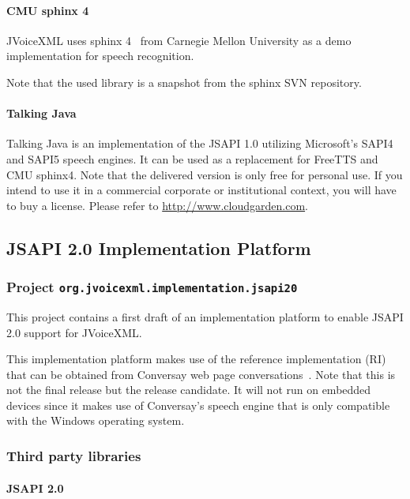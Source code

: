\documentclass[11pt,a4paper]{article}
\begin{document}
\paragraph{CMU sphinx 4}
\label{sec:sphinx}

JVoiceXML uses sphinx 4~\cite{sphinx} from Carnegie Mellon University
as a demo implementation for speech recognition.

Note that the used library is a snapshot from the sphinx SVN repository.

\paragraph{Talking Java}

Talking Java is an implementation of the JSAPI 1.0 utilizing Microsoft's
SAPI4 and SAPI5 speech engines. It can be used as a replacement for FreeTTS
and CMU sphinx4. Note that the delivered version is only free for personal use.
If you intend to use it in a commercial corporate or institutional context, you
will have to buy a license. Please refer to \url{http://www.cloudgarden.com}.

\subsection{JSAPI 2.0 Implementation Platform}
\subsubsection{Project \texttt{org.jvoicexml.implementation.jsapi20}}

This project contains a first draft of an implementation platform to enable
JSAPI 2.0 support for JVoiceXML.

This implementation platform makes use of the reference implementation (RI) that
can be obtained from Conversay web page
conversations~\cite{conversay:jsr113}. Note that this is not the final release
but the release candidate. It will not run on embedded devices since it makes
use of Conversay's speech engine that is only compatible with the Windows
operating system.

\subsubsection{Third party libraries}
\label{sec:jsapi20-third-party-libr}

\paragraph{JSAPI 2.0}
\label{sec:jsapi20}
\end{document}
